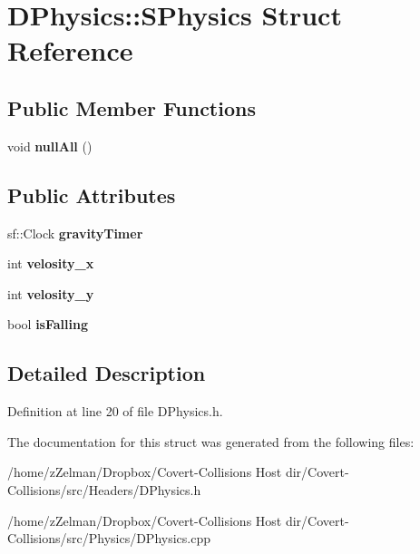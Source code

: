 \hypertarget{structDPhysics_1_1SPhysics}{\section{D\-Physics\-:\-:S\-Physics Struct Reference}
\label{structDPhysics_1_1SPhysics}
}
\subsection*{Public Member Functions}
\begin{DoxyCompactItemize}
\item 
\hypertarget{structDPhysics_1_1SPhysics_aa4cf9f9d5ae6ab52b53a76d7bc507e55}{void {\bfseries null\-All} ()}\label{structDPhysics_1_1SPhysics_aa4cf9f9d5ae6ab52b53a76d7bc507e55}

\end{DoxyCompactItemize}
\subsection*{Public Attributes}
\begin{DoxyCompactItemize}
\item 
\hypertarget{structDPhysics_1_1SPhysics_aee2f0f80a53a905eb9de32d3bb12e318}{sf\-::\-Clock {\bfseries gravity\-Timer}}\label{structDPhysics_1_1SPhysics_aee2f0f80a53a905eb9de32d3bb12e318}

\item 
\hypertarget{structDPhysics_1_1SPhysics_a2654e1fd65ea35fe4119c7866fd46274}{int {\bfseries velosity\-\_\-x}}\label{structDPhysics_1_1SPhysics_a2654e1fd65ea35fe4119c7866fd46274}

\item 
\hypertarget{structDPhysics_1_1SPhysics_a58c1f8fa61d0aeece450d7ab789c5013}{int {\bfseries velosity\-\_\-y}}\label{structDPhysics_1_1SPhysics_a58c1f8fa61d0aeece450d7ab789c5013}

\item 
\hypertarget{structDPhysics_1_1SPhysics_a39163a65d84fc6d7fd0be57560cffe12}{bool {\bfseries is\-Falling}}\label{structDPhysics_1_1SPhysics_a39163a65d84fc6d7fd0be57560cffe12}

\end{DoxyCompactItemize}


\subsection{Detailed Description}


Definition at line 20 of file D\-Physics.\-h.



The documentation for this struct was generated from the following files\-:\begin{DoxyCompactItemize}
\item 
/home/z\-Zelman/\-Dropbox/\-Covert-\/\-Collisions Host dir/\-Covert-\/\-Collisions/src/\-Headers/D\-Physics.\-h\item 
/home/z\-Zelman/\-Dropbox/\-Covert-\/\-Collisions Host dir/\-Covert-\/\-Collisions/src/\-Physics/D\-Physics.\-cpp\end{DoxyCompactItemize}
